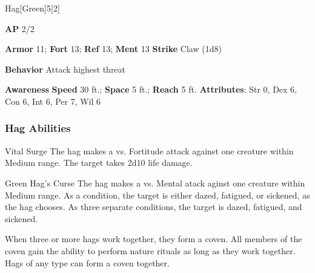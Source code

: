 \begin{monsection}{Hag}[Green]{5}[2]
\vspace{-1em}\vspace{-1em}
\begin{spellcontent}
\begin{spelltargetinginfo}
{\textbf{AP} 2/2}

\pari \textbf{Armor} 11;
\textbf{Fort} 13;
\textbf{Ref} 13;
\textbf{Ment} 13
\pari \textbf{Strike} Claw  (1d8)



\pari \textbf{Behavior} Attack highest threat
\end{spelltargetinginfo}
\end{spellcontent}

\begin{monsterfooter}
\pari \textbf{Awareness} 
\pari \textbf{Speed} 30 ft.;
\textbf{Space} 5 ft.;
\textbf{Reach} 5 ft.
\pari \textbf{Attributes}:
Str 0,
Dex 6,
Con 6,
Int 6,
Per 7,
Wil 6
\end{monsterfooter}
\end{monsection}


\subsubsection{Hag Abilities}

\begin{freeability}{Vital Surge}
The hag makes a  vs. Fortitude attack against one creature within Medium range.
\hit The target takes 2d10 life damage.
\end{freeability}

\vspace{0.5em}
\begin{freeability}{Green Hag's Curse}
The hag makes a  vs. Mental atack aginst one creature within Medium range.
\hit As a condition, the target is either dazed, fatigued, or sickened, as the hag chooses.
\crit As three separate conditions, the target is dazed, fatigued, and sickened.
\end{freeability}

When three or more hags work together, they form a coven.
All members of the coven gain the ability to perform nature rituals as long as they work together.
Hags of any type can form a coven together.

